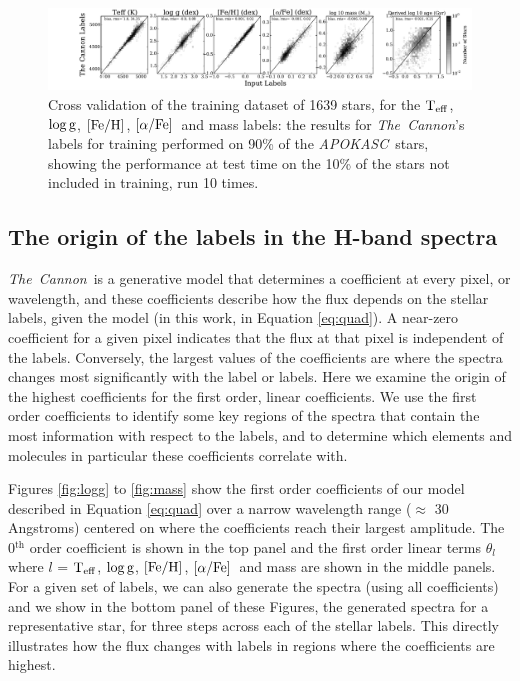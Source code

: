 \documentclass[12pt, preprint]{aastex}
\newcommand{\project}[1]{\textsl{#1}}
\newcommand{\tc}{\project{The~Cannon}}
\newcommand{\apokasc}{\project{APOKASC}}
\newcommand{\teff}{\mbox{$\rm T_{eff}$}}
\newcommand{\feh}{\mbox{$\rm [Fe/H]$}}
\newcommand{\alphafe}{\mbox{$\rm [\alpha/Fe]$}}
\newcommand{\logg}{\mbox{$\rm \log g$}}
\begin{document}
\begin{figure}[h!]
\centering
        \includegraphics[scale=0.4]{./plots/validation_1639_6.pdf}
  \caption{Cross validation of the training dataset of 1639 stars, for the \teff, \logg, \feh, \alphafe\ and mass labels: the results for \tc's labels for training performed on 90\% of the \apokasc\ stars, showing the performance at test time on the 10\% of the stars not included in training, run 10 times.}
\label{fig:validation1}
\end{figure}

\subsection{The origin of the labels in the H-band spectra}

\tc\ is a generative model that determines a coefficient at every pixel, or wavelength, and these coefficients describe how the flux depends on the stellar labels, given the model (in this work, in Equation \ref{eq:quad}).   A near-zero coefficient for a given pixel indicates that the flux at that pixel is independent of the labels. Conversely, the largest values of the coefficients are where the spectra changes most significantly with the label or labels. Here we examine the origin of the highest coefficients for the first order, linear coefficients. We use the first order coefficients to identify some key regions of the spectra that contain the most information with respect to the labels, and to determine which elements and molecules in particular these coefficients correlate with. 

Figures \ref{fig:logg} to \ref{fig:mass} show the first order coefficients of our model described in Equation \ref{eq:quad} over a narrow wavelength range ($\approx$ 30 Angstroms) centered on where the coefficients reach their largest amplitude. The 0$^{\mbox{th}}$ order coefficient is shown in the top panel and the first order linear terms $\theta_l$ where $l$ = \teff, \logg, \feh, \alphafe\ and mass are shown in the middle panels. For a given set of labels, we can also generate the spectra (using all coefficients) and we  show in the bottom panel of these Figures, the generated spectra for a representative star, for three steps across each of the stellar labels. This directly illustrates how the flux changes with labels in regions where the coefficients are highest.  
\end{document}

